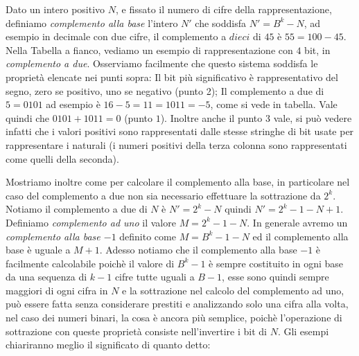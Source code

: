 Dato un intero positivo $N$, e fissato il numero di cifre della rappresentazione, definiamo \emph{complemento alla base} l'intero $N'$
che soddisfa $N'= B^k-N$, ad esempio in decimale con due cifre,
il complemento a $dieci$ di $45$ è $55 = 100-45$. 
Nella Tabella a fianco, vediamo un esempio di rappresentazione con $4$ bit, in \emph{complemento a due}. Osserviamo facilmente che questo sistema soddisfa le proprietà elencate nei punti sopra: Il bit più significativo è rappresentativo del segno, zero se positivo, uno se negativo (punto 2); Il complemento a due di $5 = 0101$ ad esempio è  $16-5 = 11 = 1011 = -5$, come si vede in tabella. Vale quindi che $0101+1011 = 0$ (punto $1$). Inoltre anche il punto $3$ vale, si può vedere infatti che i valori positivi sono rappresentati dalle stesse stringhe di bit usate per rappresentare i naturali (i numeri positivi della terza colonna sono rappresentati come quelli della seconda).

Mostriamo inoltre come per calcolare il complemento alla base, in particolare
nel caso del complemento a due non sia necessario effettuare la sottrazione da
$2^k$. Notiamo il complemento a due di $N$ è $N' = 2^k - N$ quindi $N' = 2^k-1-N+1$. Definiamo \emph{complemento ad uno} il valore $M = 2^k-1-N$.
In generale avremo un \emph{complemento alla base $-1$} definito come $M = B^k-1-N$ ed il complemento alla base è uguale a $M+1$. Adesso notiamo che
il complemento alla base $-1$ è facilmente calcolabile poichè il valore
di $B^k-1$ è sempre costituito in ogni base da una sequenza di $k-1$ cifre tutte uguali a $B-1$, esse sono quindi sempre maggiori di ogni cifra in $N$ e
la sottrazione nel calcolo del complemento ad uno, può essere fatta senza
considerare prestiti e analizzando solo una cifra alla volta, nel caso dei numeri binari, la cosa è ancora più semplice, poichè l'operazione di sottrazione con queste proprietà consiste nell'invertire i bit di $N$.
Gli esempi chiariranno meglio il significato di quanto detto:

